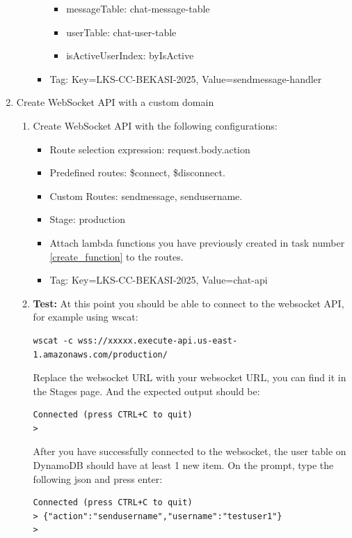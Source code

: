 \documentclass{article}
\begin{document}
\begin{enumerate}
\begin{enumerate}
\begin{itemize}
      \begin{itemize}
        \item messageTable: chat-message-table
        \item userTable: chat-user-table
        \item isActiveUserIndex: byIsActive
      \end{itemize}
      \item Tag: Key=LKS-CC-BEKASI-2025, Value=sendmessage-handler
    \end{itemize}
  \end{enumerate}
  \item Create WebSocket API with a custom domain
    \begin{enumerate}
      \item Create WebSocket API with the following configurations:
      \begin{itemize}
        \item Route selection expression: request.body.action
        \item Predefined routes: \$connect, \$disconnect.
        \item Custom Routes: sendmessage, sendusername.
        \item Stage: production
        \item Attach lambda functions you have previously created in task number \ref{create_function} to the routes.
      \item Tag: Key=LKS-CC-BEKASI-2025, Value=chat-api
      \end{itemize}
      \item {\color{red}\textbf{Test:}} At this point you should be able to connect to the websocket API, for example using wscat:
      \begin{verbatim}
wscat -c wss://xxxxx.execute-api.us-east-1.amazonaws.com/production/
      \end{verbatim}
      Replace the websocket URL with your websocket URL, you can find it in the Stages page. And the expected output should be:
      \begin{verbatim}
Connected (press CTRL+C to quit)
>
      \end{verbatim}
      After you have successfully connected to the websocket, the user table on DynamoDB should have at least 1 new item.
      On the prompt, type the following json and press enter:
      \begin{verbatim}
Connected (press CTRL+C to quit)
> {"action":"sendusername","username":"testuser1"}
> 
      \end{verbatim}

\end{enumerate}
\end{enumerate}
\end{document}
